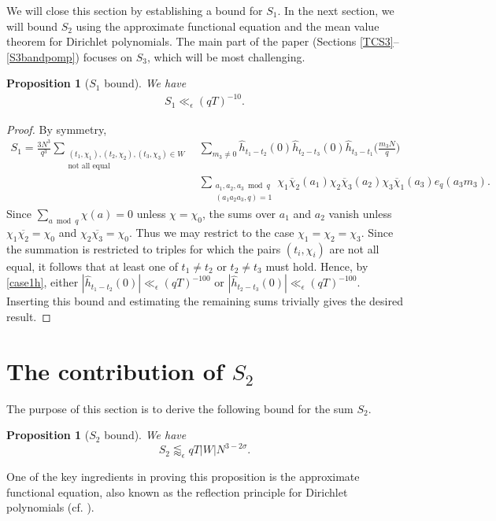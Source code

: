 \documentclass[12pt]{amsart}
\newtheorem{proposition}[theorem]{Proposition}
\theoremstyle{definition}
\theoremstyle{plain}
\theoremstyle{remark}
\numberwithin{equation}{section}
\numberwithin{theorem}{section}
\numberwithin{equation}{section}
\begin{document}
	We will close this section by establishing a bound for $S_{1}$. In the next section, we will bound $S_{2}$ using the approximate functional equation and the mean value theorem for Dirichlet polynomials. The main part of the paper (Sections \ref{TCS3}--\ref{S3bandpomp}) focuses on $S_{3}$, which will be most challenging.
	
	\begin{proposition}[$S_1$ bound]\label{S_1 bound}
		We have 
		\begin{align*}
			S_1 \ll_{\epsilon} (qT)^{-10}.
		\end{align*}
	\end{proposition}
	\begin{proof}
		By symmetry,
		\begin{align*}
			S_1=\frac{3N^{3}}{q^{3}} \sum_{\substack{(t_1,\chi_1),(t_2,\chi_2), (t_3,\chi_3) \in W \\ \text{not all equal}}}  &\sum_{m_3\neq 0}
			\hat{h}_{t_1-t_2}(0)\hat{h}_{t_2-t_3}(0)\hat{h}_{t_3-t_1}\bigg(\frac{m_3N}{q}\bigg) 
			\\
			&\sum_{\substack{a_1,a_2,a_3 \bmod q \\ (a_1a_2a_3,q)=1}}\chi_{1}\overline{\chi}_{2}(a_{1})
			\chi_{2}\overline{\chi}_{3}(a_{2})
			\chi_{3}\overline{\chi}_{1}(a_{3})
			e_q(a_3m_3).
		\end{align*}
		Since
		$\sum_{a \bmod q}\chi(a)=0$
		unless $\chi=\chi_0$, the sums over $a_1$ and $a_2$ vanish unless $
		\chi_1\overline{\chi_2}=\chi_0$ and
		$\chi_2\overline{\chi_3}=\chi_0.$
		Thus we may restrict to the case \(\chi_1=\chi_2=\chi_3\). Since the summation is restricted to triples for which the pairs \((t_i,\chi_i)\) are not all equal, it follows that at least one of \(t_1\neq t_2\) or \(t_2\neq t_3\) must hold. Hence, by \eqref{case1h}, either
		$
		|\hat{h}_{t_1-t_2}(0)|\ll_{\epsilon}(qT)^{-100}
		$
		or
		$
		|\hat{h}_{t_2-t_3}(0)|\ll_{\epsilon}(qT)^{-100}.
		$
		Inserting this bound and estimating the remaining sums trivially gives the desired result.
	\end{proof}
	
	\section{\texorpdfstring{The contribution of $S_{2}$}
		{The contribution of S2}}\label{contS2}
	The purpose of this section is to derive the following bound for the sum $S_{2}$.
	
	\begin{proposition}[$S_{2}$ bound]\label{S2B}
		We have
		\[S_{2}\lessapprox_{\epsilon} qT|W|N^{3-2\sigma}.\]
	\end{proposition}
	One of the key ingredients in proving this proposition is the approximate functional equation, also known as the reflection principle for Dirichlet polynomials (cf. \cite[Lemma 1]{Jutila1977}).
	
\end{document}

